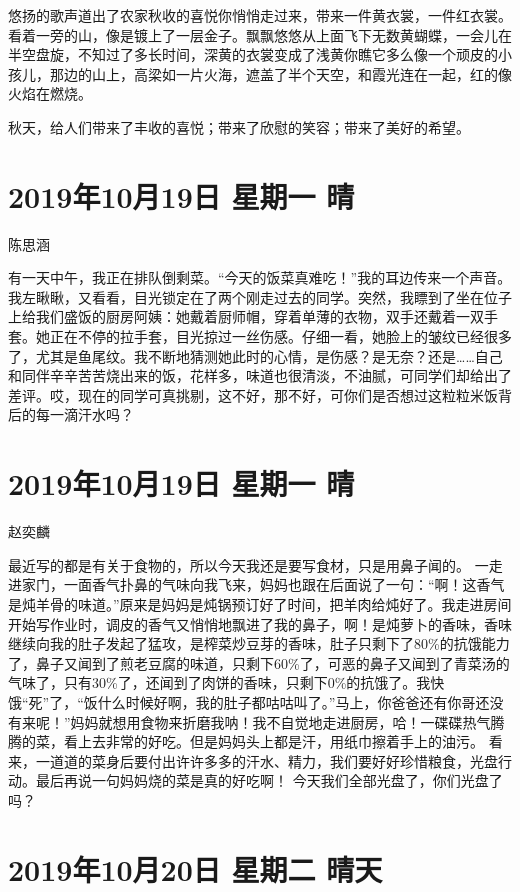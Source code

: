 悠扬的歌声道出了农家秋收的喜悦你悄悄走过来，带来一件黄衣裳，一件红衣裳。看着一旁的山，像是镀上了一层金子。飘飘悠悠从上面飞下无数黄蝴蝶，一会儿在半空盘旋，不知过了多长时间，深黄的衣裳变成了浅黄你瞧它多么像一个顽皮的小孩儿，那边的山上，高梁如一片火海，遮盖了半个天空，和霞光连在一起，红的像火焰在燃烧。

秋天，给人们带来了丰收的喜悦；带来了欣慰的笑容；带来了美好的希望。

\section{2019年10月19日 星期一 晴}

陈思涵

有一天中午，我正在排队倒剩菜。``今天的饭菜真难吃！''我的耳边传来一个声音。我左瞅瞅，又看看，目光锁定在了两个刚走过去的同学。突然，我瞟到了坐在位子上给我们盛饭的厨房阿姨：她戴着厨师帽，穿着单薄的衣物，双手还戴着一双手套。她正在不停的拉手套，目光掠过一丝伤感。仔细一看，她脸上的皱纹已经很多了，尤其是鱼尾纹。我不断地猜测她此时的心情，是伤感？是无奈？还是\ldots\ldots 自己和同伴辛辛苦苦烧出来的饭，花样多，味道也很清淡，不油腻，可同学们却给出了差评。哎，现在的同学可真挑剔，这不好，那不好，可你们是否想过这粒粒米饭背后的每一滴汗水吗？

\section{2019年10月19日 星期一 晴}

赵奕麟

最近写的都是有关于食物的，所以今天我还是要写食材，只是用鼻子闻的。
一走进家门，一面香气扑鼻的气味向我飞来，妈妈也跟在后面说了一句：``啊！这香气是炖羊骨的味道。''原来是妈妈是炖锅预订好了时间，把羊肉给炖好了。我走进房间开始写作业时，调皮的香气又悄悄地飘进了我的鼻子，啊！是炖萝卜的香味，香味继续向我的肚子发起了猛攻，是榨菜炒豆芽的香味，肚子只剩下了80\%的抗饿能力了，鼻子又闻到了煎老豆腐的味道，只剩下60\%了，可恶的鼻子又闻到了青菜汤的气味了，只有30\%了，还闻到了肉饼的香味，只剩下0\%的抗饿了。我快饿``死''了，``饭什么时候好啊，我的肚子都咕咕叫了。''马上，你爸爸还有你哥还没有来呢！''妈妈就想用食物来折磨我呐！我不自觉地走进厨房，哈！一碟碟热气腾腾的菜，看上去非常的好吃。但是妈妈头上都是汗，用纸巾擦着手上的油污。
看来，一道道的菜身后要付出许许多多的汗水、精力，我们要好好珍惜粮食，光盘行动。最后再说一句妈妈烧的菜是真的好吃啊！
今天我们全部光盘了，你们光盘了吗？

\section{2019年10月20日 星期二 晴天}

